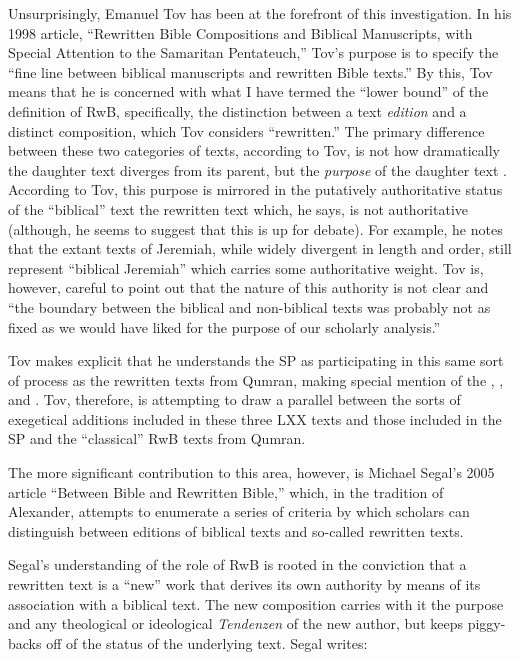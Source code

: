 Unsurprisingly, Emanuel Tov has been at the forefront of this
investigation. In his 1998 article, ``Rewritten Bible Compositions and
Biblical Manuscripts, with Special Attention to the Samaritan
Pentateuch,'' Tov's purpose is to specify the ``fine line between
biblical manuscripts and rewritten Bible
texts.''\autocite[334]{tov_dsd1998} By this, Tov means that he is
concerned with what I have termed the ``lower bound'' of the definition
of RwB, specifically, the distinction between a text \emph{edition} and
a distinct composition, which Tov considers ``rewritten.'' The primary
difference between these two categories of texts, according to Tov, is
not how dramatically the daughter text diverges from its parent, but the
\emph{purpose} of the daughter text \autocite[334]{tov_dsd1998}.
According to Tov, this purpose is mirrored in the putatively
authoritative status of the ``biblical'' text \visavis the rewritten
text which, he says, is not authoritative (although, he seems to suggest
that this is up for debate\autocite[337]{tov_dsd1998}). For example, he
notes that the extant texts of Jeremiah, while widely divergent in
length and order, still represent ``biblical Jeremiah'' which carries
some authoritative weight. Tov is, however, careful to point out that
the nature of this authority is not clear and ``the boundary between the
biblical and non-biblical texts was probably not as fixed as we would
have liked for the purpose of our scholarly
analysis.''\autocite[335]{tov_dsd1998}

Tov makes explicit that he understands the SP as participating in this
same sort of process as the rewritten texts from Qumran, making special
mention of the \templescroll, \ga, and
\jub. Tov, therefore, is attempting to draw a parallel
between the sorts of exegetical additions included in these three LXX
texts and those included in the SP and the ``classical'' RwB texts from
Qumran.

The more significant contribution to this area, however, is Michael
Segal's 2005 article ``Between Bible and Rewritten Bible,'' which, in
the tradition of Alexander, attempts to enumerate a series of criteria
by which scholars can distinguish between editions of biblical texts and
so-called rewritten texts.

Segal's understanding of the role of RwB is rooted in the conviction
that a rewritten text is a ``new'' work that derives its own authority
by means of its association with a biblical text. The new composition
carries with it the purpose and any theological or ideological
\emph{Tendenzen} of the new author, but keeps piggy-backs off of the
status of the underlying text.\autocite[11]{segal_henze2005} Segal
writes:

